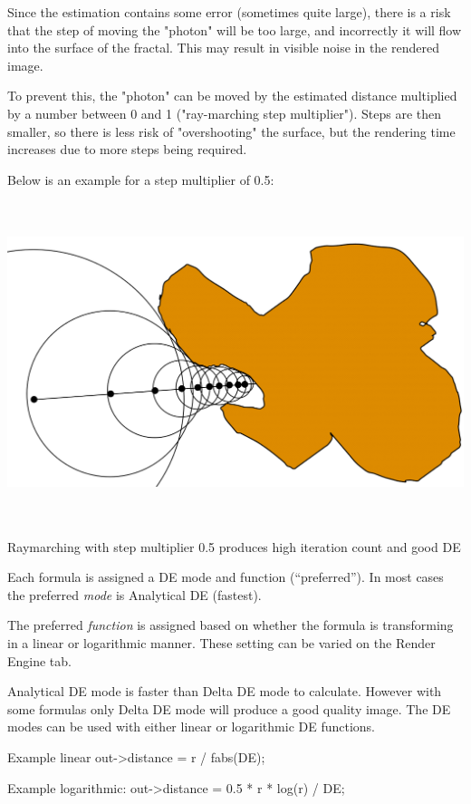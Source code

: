 Since the estimation contains some error (sometimes quite large), there
is a risk that the step of moving the "photon" will be too large, and
incorrectly it will flow into the surface of the fractal. This may
result in visible noise in the rendered image.

To prevent this, the "photon" can be moved by the estimated distance
multiplied by a number between 0 and 1 ("ray-marching step multiplier").
Steps are then smaller, so there is less risk of "overshooting" the
surface, but the rendering time increases due to more steps being
required.

Below is an example for a step multiplier of 0.5:

\includegraphics[width=6.68611in,height=3.67431in]{img/manual/media/image5.png}

Raymarching with step multiplier 0.5 produces high iteration count and
good DE

Each formula is assigned a DE mode and function (``preferred''). In most
cases the preferred \emph{mode} is Analytical DE (fastest).

The preferred \emph{function} is assigned based on whether the formula
is transforming in a linear or logarithmic manner. These setting can be
varied on the Render Engine tab.

Analytical DE mode is faster than Delta DE mode to calculate. However
with some formulas only Delta DE mode will produce a good quality image.
The DE modes can be used with either linear or logarithmic DE functions.

Example linear out-\textgreater{}distance = r / fabs(DE);

Example logarithmic: out-\textgreater{}distance = 0.5 * r * log(r) / DE;

